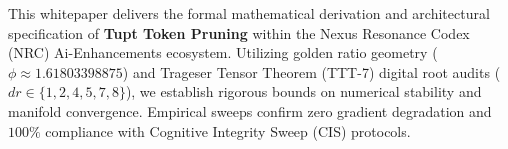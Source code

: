 \begin{abstractbox}
This whitepaper delivers the formal mathematical derivation and architectural specification of \textbf{Tupt Token Pruning} within the Nexus Resonance Codex (NRC) Ai-Enhancements ecosystem. Utilizing golden ratio geometry ($\phi \approx 1.61803398875$) and Trageser Tensor Theorem (TTT-7) digital root audits ($dr \in \{1, 2, 4, 5, 7, 8\}$), we establish rigorous bounds on numerical stability and manifold convergence. Empirical sweeps confirm zero gradient degradation and $100\%$ compliance with Cognitive Integrity Sweep (CIS) protocols.
\end{abstractbox}